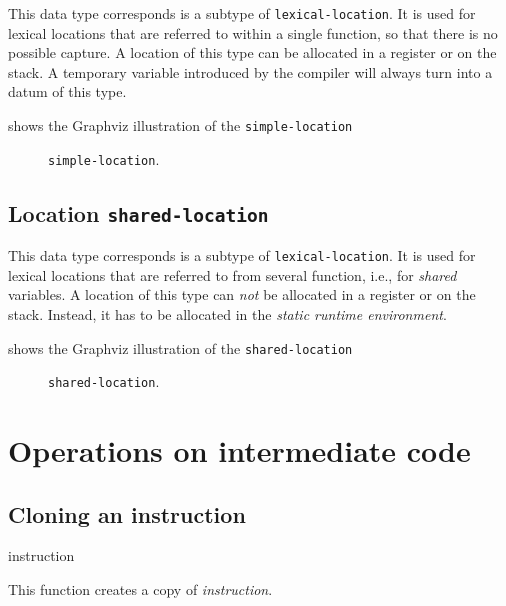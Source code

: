 This data type corresponds is a subtype of \texttt{lexical-location}.
It is used for lexical locations that are referred to within a single
function, so that there is no possible capture.  A location of this
type can be allocated in a register or on the stack.  A temporary
variable introduced by the compiler will always turn into a datum of
this type.

 shows the Graphviz illustration of the
\texttt{simple-location}

\begin{figure}
\begin{center}
\end{center}
\caption{\label{fig-simple-location}
\texttt{simple-location}.}
\end{figure}

\subsection{Location \texttt{shared-location}}

This data type corresponds is a subtype of \texttt{lexical-location}.
It is used for lexical locations that are referred to from several
function, i.e., for \emph{shared} variables.  A location of this
type can \emph{not} be allocated in a register or on the stack.
Instead, it has to be allocated in the \emph{static runtime
  environment}. 

 shows the Graphviz illustration of the
\texttt{shared-location}

\begin{figure}
\begin{center}
\end{center}
\caption{\label{fig-shared-location}
\texttt{shared-location}.}
\end{figure}

\section{Operations on intermediate code}

\subsection{Cloning an instruction}

 {instruction}

This function creates a copy of \textit{instruction}.

